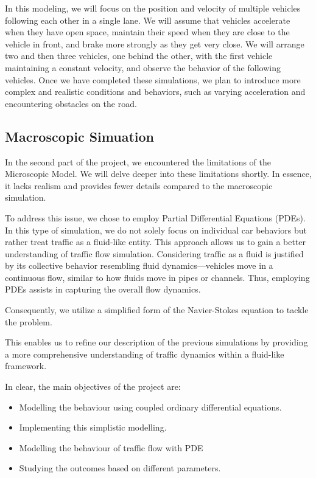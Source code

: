\documentclass{article}
\begin{document}
	In this modeling, we will focus on the position and velocity of multiple vehicles following each other in a single lane. We will assume that vehicles accelerate when they have open space, maintain their speed when they are close to the vehicle in front, and brake more strongly as they get very close. We will arrange two and then three vehicles, one behind the other, with the first vehicle maintaining a constant velocity, and observe the behavior of the following vehicles.
	Once we have completed these simulations, we plan to introduce more complex and realistic conditions and behaviors, such as varying acceleration and encountering obstacles on the road.
	
	\subsection{Macroscopic Simuation}
	
	In the second part of the project, we encountered the limitations of the Microscopic Model. We will delve deeper into these limitations shortly. In essence, it lacks realism and provides fewer details compared to the macroscopic simulation.
	
	To address this issue, we chose to employ Partial Differential Equations (PDEs). In this type of simulation, we do not solely focus on individual car behaviors but rather treat traffic as a fluid-like entity. This approach allows us to gain a better understanding of traffic flow simulation. Considering traffic as a fluid is justified by its collective behavior resembling fluid dynamics—vehicles move in a continuous flow, similar to how fluids move in pipes or channels. Thus, employing PDEs assists in capturing the overall flow dynamics.
	
	Consequently, we utilize a simplified form of the Navier-Stokes equation to tackle the problem.
	
	This enables us to refine our description of the previous simulations by providing a more comprehensive understanding of traffic dynamics within a fluid-like framework. \newline\newline
	
	In clear, the main objectives of the project are: 
	\begin{itemize}
		\item Modelling the behaviour using coupled ordinary differential equations.
		\item Implementing this simplistic modelling.
		\item Modelling the behaviour of traffic flow with PDE
		\item Studying the outcomes based on different parameters.
	\end{itemize}
	
\end{document}
